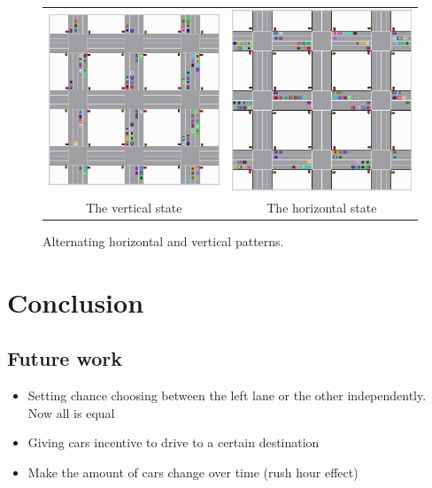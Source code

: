 \documentclass[a4paper,11pt]{article}
\begin{document}
\begin{figure}[H]
  \centering
  \begin{tabular}{cc}
  \includegraphics[width=.45\linewidth]{img/vertical.png} & \includegraphics[width=.45\linewidth]{img/horizontal.png}\\
  The vertical state & The horizontal state\\
  \end{tabular}
  \caption{Alternating horizontal and vertical patterns.}
  \label{fig:pattern}
\end{figure}

\section{Conclusion}\label{sec:conclusion}


\subsection{Future work}

\begin{itemize}
 \item Setting chance choosing between the left lane or the other independently. Now all is equal %
 \item Giving cars incentive to drive to a certain destination
 \item Make the amount of cars change over time (rush hour effect)
\end{itemize}
\end{document}
